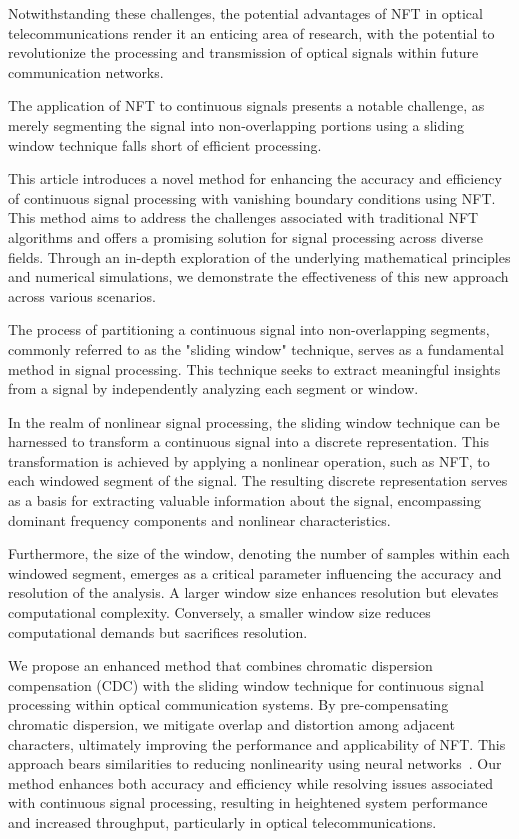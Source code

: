 Notwithstanding these challenges, the potential advantages of NFT in optical telecommunications render it an enticing area of research, with the potential to revolutionize the processing and transmission of optical signals within future communication networks.

The application of NFT to continuous signals presents a notable challenge, as merely segmenting the signal into non-overlapping portions using a sliding window technique falls short of efficient processing.

This article introduces a novel method for enhancing the accuracy and efficiency of continuous signal processing with vanishing boundary conditions using NFT. This method aims to address the challenges associated with traditional NFT algorithms and offers a promising solution for signal processing across diverse fields. Through an in-depth exploration of the underlying mathematical principles and numerical simulations, we demonstrate the effectiveness of this new approach across various scenarios.

The process of partitioning a continuous signal into non-overlapping segments, commonly referred to as the "sliding window" technique, serves as a fundamental method in signal processing. This technique seeks to extract meaningful insights from a signal by independently analyzing each segment or window.

In the realm of nonlinear signal processing, the sliding window technique can be harnessed to transform a continuous signal into a discrete representation. This transformation is achieved by applying a nonlinear operation, such as NFT, to each windowed segment of the signal. The resulting discrete representation serves as a basis for extracting valuable information about the signal, encompassing dominant frequency components and nonlinear characteristics.

Furthermore, the size of the window, denoting the number of samples within each windowed segment, emerges as a critical parameter influencing the accuracy and resolution of the analysis. A larger window size enhances resolution but elevates computational complexity. Conversely, a smaller window size reduces computational demands but sacrifices resolution.

We propose an enhanced method that combines chromatic dispersion compensation (CDC) with the sliding window technique for continuous signal processing within optical communication systems. By pre-compensating chromatic dispersion, we mitigate overlap and distortion among adjacent characters, ultimately improving the performance and applicability of NFT. This approach bears similarities to reducing nonlinearity using neural networks~\cite{9324921, 8535144, freire2021performance, zibar2015machine, cartledge2017digital}. Our method enhances both accuracy and efficiency while resolving issues associated with continuous signal processing, resulting in heightened system performance and increased throughput, particularly in optical telecommunications.